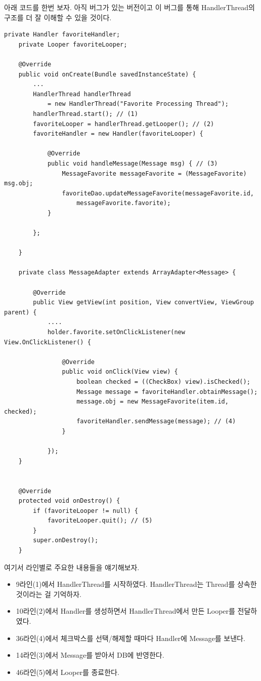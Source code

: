 아래 코드를 한번 보자. 아직 버그가 있는 버전이고 이 버그를 통해 HandlerThread의 구조를 더 잘 이해할 수 있을 것이다.
\newpage
\begin{lstlisting}[frame=single, caption=HandlerThread 사용 예제(버그 존재), label=src:HandlerThreadSample] 
 	private Handler favoriteHandler;
    private Looper favoriteLooper;

    @Override
    public void onCreate(Bundle savedInstanceState) {
       	... 
       	HandlerThread handlerThread 
       		= new HandlerThread("Favorite Processing Thread");
        handlerThread.start(); // (1)
        favoriteLooper = handlerThread.getLooper(); // (2)
        favoriteHandler = new Handler(favoriteLooper) {

            @Override
            public void handleMessage(Message msg) { // (3)
                MessageFavorite messageFavorite = (MessageFavorite) msg.obj;
                favoriteDao.updateMessageFavorite(messageFavorite.id, 
                	messageFavorite.favorite);
            }

        };
        
	}

	private class MessageAdapter extends ArrayAdapter<Message> {
		
		@Override
        public View getView(int position, View convertView, ViewGroup parent) {	
        	....
			holder.favorite.setOnClickListener(new View.OnClickListener() {

                @Override
                public void onClick(View view) {
                    boolean checked = ((CheckBox) view).isChecked();
                    Message message = favoriteHandler.obtainMessage();
                    message.obj = new MessageFavorite(item.id, checked);
                    favoriteHandler.sendMessage(message); // (4)
                }

            });
	}
	
	
	@Override
    protected void onDestroy() {
        if (favoriteLooper != null) {
            favoriteLooper.quit(); // (5)
        }
        super.onDestroy();
    }
\end{lstlisting}

여기서 라인별로 주요한 내용들을 얘기해보자.
\begin{itemize}
\item 9라인(1)에서 HandlerThread를 시작하였다. HandlerThread는 Thread를 상속한 것이라는 걸 기억하자.
\item 10라인(2)에서 Handler를 생성하면서 HandlerThread에서 만든 Looper를 전달하였다.
\item 36라인(4)에서 체크박스를 선택/해제할 때마다 Handler에 Message를 보낸다.
\item 14라인(3)에서 Message를 받아서 DB에 반영한다.
\item 46라인(5)에서 Looper를 종료한다. 
\end{itemize}

